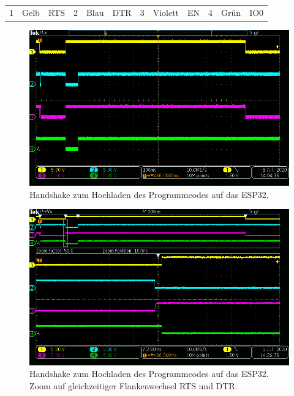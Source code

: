 \begin{enumerate}
\begin{enumerate}
\newpage
\begin{table}[h!]
\center
\begin{tabular}{lcl|lcl|lcl|lcl}
1 & Gelb & RTS & 2 & Blau & DTR & 3 & Violett & EN & 4 & Grün & IO0\\
\end{tabular}
\end{table}
\begin{figure}[h!]
\center
\includegraphics[width = \textwidth]{graphics/ESP32_RTS_DTR_EN_IO0_gesamt}
\caption{Handshake zum Hochladen des Programmcodes auf das ESP32.}
\label{fig:ESP32_RTS_DTR_EN_IO0_gesamt}
\end{figure}

\begin{figure}[h!]
\center
\includegraphics[width = \textwidth]{graphics/ESP32_RTS_DTR_EN_IO0_2}
\caption{Handshake zum Hochladen des Programmcodes auf das ESP32. Zoom auf gleichzeitiger Flankenwechsel RTS und DTR.}
\label{fig:ESP32_RTS_DTR_EN_IO0_2}
\end{figure}


\end{enumerate}
\end{enumerate}
